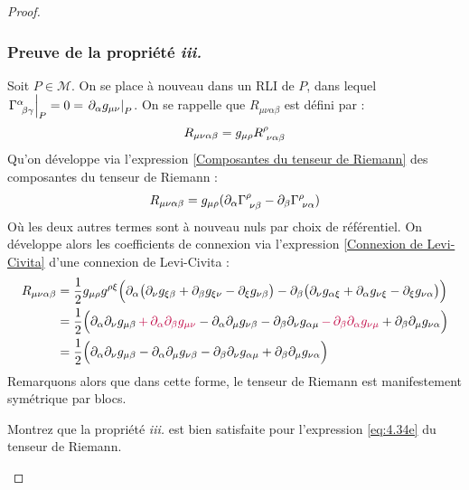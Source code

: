 \begin{proof}
    \subsubsection{Preuve de la propriété \emph{iii.}}
        Soit $P\in \mathcal{M}$. On se place à nouveau dans un RLI de $P$, dans lequel $\atP{\Gamma\indices{^{\alpha}_{\!\beta \gamma}}} = 0 = \atP{\partial_{\alpha}g_{\mu \nu}}$.
        On se rappelle que $R_{\mu\nu \alpha \beta}$ est défini par :
        \begin{equation}
            R_{\mu\nu\alpha\beta} = g_{\mu \rho} R\indices{^\rho_{\!\nu\alpha\beta}}
        \end{equation}
        Qu'on développe via l'expression \ref{Composantes du tenseur de Riemann} des composantes du tenseur de Riemann :
        \begin{align}
            R_{\mu\nu\alpha\beta} = g_{\mu \rho}(\partial_{\alpha}\Gamma\indices{^{\rho}_{\!\nu \beta}} - \partial_{\beta}\Gamma\indices{^{\rho}_{\!\nu \alpha}})
        \end{align}
        Où les deux autres termes sont à nouveau nuls par choix de référentiel. On développe alors les coefficients de connexion via l'expression \ref{Connexion de Levi-Civita} d'une connexion de Levi-Civita :
        \begin{align}
            \nonumber
            R_{\mu\nu\alpha\beta} &= \frac{1}{2}g_{\mu \rho} g^{\rho \xi} \Bigl( \partial_{\alpha}\bigl(\partial_{\nu}g_{\xi \beta} + \partial_{\beta}g_{\xi \nu} - \partial_{\xi}g_{\nu \beta}\bigr) - \partial_{\beta}\bigl(\partial_{\nu}g_{\alpha \xi} + \partial_{\alpha}g_{\nu \xi} - \partial_{\xi}g_{\nu \alpha}\bigr) \Bigr)\\
            &= \frac{1}{2}\Bigl(\partial_{\alpha}\partial_{\nu}g_{\mu \beta} \,\textcolor{purple}{+\, \partial_{\alpha}\partial_{\beta}g_{\mu \nu}} - \partial_{\alpha}\partial_{\mu}g_{\nu \beta} - \partial_{\beta}\partial_{\nu}g_{\alpha \mu} \,\textcolor{purple}{-\, \partial_{\beta}\partial_{\alpha}g_{\nu \mu}} + \partial_{\beta}\partial_{\mu}g_{\nu \alpha}\Bigr)\\
            \label{eq:4.34e}
            &= \frac{1}{2}\Bigl(\partial_{\alpha}\partial_{\nu}g_{\mu \beta} - \partial_{\alpha}\partial_{\mu}g_{\nu \beta} - \partial_{\beta}\partial_{\nu}g_{\alpha \mu} + \partial_{\beta}\partial_{\mu}g_{\nu \alpha} \Bigr)
        \end{align}
        Remarquons alors que dans cette forme, le tenseur de Riemann est manifestement symétrique par blocs.
        \begin{exerc}
            Montrez que la propriété \emph{iii.} est bien satisfaite pour l'expression \ref{eq:4.34e} du tenseur de Riemann.
        \end{exerc}

\end{proof}
